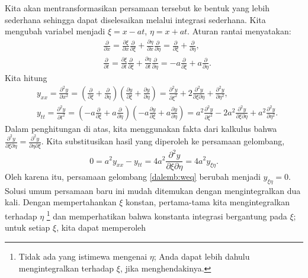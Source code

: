 Kita akan mentransformasikan persamaan tersebut ke bentuk yang lebih sederhana sehingga dapat diselesaikan melalui
integrasi sederhana.
Kita mengubah variabel menjadi $\xi = x - at$, $\eta = x + at$.
Aturan rantai menyatakan:
\begin{align*}
& \frac{\partial}{\partial x}
=
\frac{\partial \xi}{\partial x}
\frac{\partial}{\partial \xi}
+
\frac{\partial \eta}{\partial x}
\frac{\partial}{\partial \eta}
=
\frac{\partial}{\partial \xi}
+
\frac{\partial}{\partial \eta} , \\
& \frac{\partial}{\partial t}
=
\frac{\partial \xi}{\partial t}
\frac{\partial}{\partial \xi}
+
\frac{\partial \eta}{\partial t}
\frac{\partial}{\partial \eta}
=
-a
\frac{\partial}{\partial \xi}
+
a
\frac{\partial}{\partial \eta} .
\end{align*}
Kita hitung
\begin{align*}
& y_{xx} = \frac{\partial^2 y}{\partial x^2}
=
\left(
\frac{\partial}{\partial \xi}
+
\frac{\partial}{\partial \eta}
\right)
\left(
\frac{\partial y}{\partial \xi}
+
\frac{\partial y}{\partial \eta}
\right)
=
\frac{\partial^2 y}{\partial \xi^2}
+
2 \frac{\partial^2 y}{\partial \xi \partial \eta}
+
\frac{\partial^2 y}{\partial \eta^2} ,
\\
& y_{tt} = \frac{\partial^2 y}{\partial t^2}
=
\left(
-a
\frac{\partial}{\partial \xi}
+ a
\frac{\partial}{\partial \eta}
\right)
\left(
-a
\frac{\partial y}{\partial \xi}
+
a
\frac{\partial y}{\partial \eta}
\right)
=
a^2
\frac{\partial^2 y}{\partial \xi^2}
-
2 a^2 \frac{\partial^2 y}{\partial \xi \partial \eta}
+
a^2
\frac{\partial^2 y}{\partial \eta^2} .
\end{align*}
Dalam penghitungan di atas, kita menggunakan fakta dari kalkulus bahwa
$\frac{\partial^2 y}{\partial \xi \partial \eta} = 
\frac{\partial^2 y}{\partial \eta \partial \xi}$.
Kita substitusikan hasil yang diperoleh ke persamaan gelombang,
\begin{equation*}
0 = a^2 y_{xx} - y_{tt} =
4 a^2 \frac{\partial^2 y}{\partial \xi \partial \eta} = 4 a^2 y_{\xi\eta} .
\end{equation*}
Oleh karena itu, persamaan gelombang \eqref{dalemb:weq} berubah menjadi
$y_{\xi\eta} = 0$.
Solusi umum persamaan baru ini mudah ditemukan dengan mengintegralkan
dua kali.  Dengan mempertahankan $\xi$ konstan, pertama-tama kita mengintegralkan terhadap $\eta$%
\footnote{Tidak ada yang istimewa mengenai $\eta$; Anda dapat lebih dahulu mengintegralkan terhadap
$\xi$, jika menghendakinya.}
dan memperhatikan bahwa
konstanta integrasi bergantung pada $\xi$; untuk setiap $\xi$, kita dapat memperoleh
